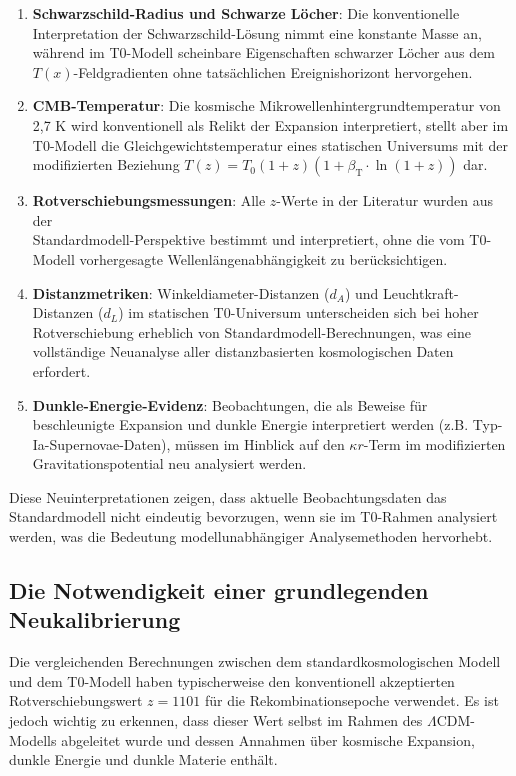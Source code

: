 \documentclass[12pt,a4paper]{article}
\newcommand{\Tfield}{T(x)}
\newcommand{\betaT}{\beta_{\text{T}}}
\newcommand{\Tzero}{T_0}
\begin{document}
	\begin{enumerate}
		\item \textbf{Schwarzschild-Radius und Schwarze Löcher}: Die konventionelle Interpretation der Schwarzschild-Lösung nimmt eine konstante Masse an, während im T0-Modell scheinbare Eigenschaften schwarzer Löcher aus dem $\Tfield$-Feldgradienten ohne tatsächlichen Ereignishorizont hervorgehen.
		\item \textbf{CMB-Temperatur}: Die kosmische Mikrowellenhintergrundtemperatur von 2,7 K wird konventionell als Relikt der Expansion interpretiert, stellt aber im T0-Modell die Gleichgewichtstemperatur eines statischen Universums mit der modifizierten Beziehung $T(z) = \Tzero (1 + z) (1 + \betaT \cdot \ln(1 + z))$ dar.
		\item \textbf{Rotverschiebungsmessungen}: Alle $z$-Werte in der Literatur wurden aus der \\Standardmodell-Perspektive bestimmt und interpretiert, ohne die vom T0-Modell vorhergesagte Wellenlängenabhängigkeit zu berücksichtigen.
		\item \textbf{Distanzmetriken}: Winkeldiameter-Distanzen ($d_A$) und Leuchtkraft-Distanzen ($d_L$) im statischen T0-Universum unterscheiden sich bei hoher Rotverschiebung erheblich von Standardmodell-Berechnungen, was eine vollständige Neuanalyse aller distanzbasierten kosmologischen Daten erfordert.
		\item \textbf{Dunkle-Energie-Evidenz}: Beobachtungen, die als Beweise für beschleunigte Expansion und dunkle Energie interpretiert werden (z.B. Typ-Ia-Supernovae-Daten), müssen im Hinblick auf den $\kappa r$-Term im modifizierten Gravitationspotential neu analysiert werden.
	\end{enumerate}
	
	Diese Neuinterpretationen zeigen, dass aktuelle Beobachtungsdaten das Standardmodell nicht eindeutig bevorzugen, wenn sie im T0-Rahmen analysiert werden, was die Bedeutung modellunabhängiger Analysemethoden hervorhebt.
	
	\subsection{Die Notwendigkeit einer grundlegenden Neukalibrierung}
	
	Die vergleichenden Berechnungen zwischen dem standardkosmologischen Modell und dem T0-Modell haben typischerweise den konventionell akzeptierten Rotverschiebungswert $z = 1101$ für die Rekombinationsepoche verwendet. Es ist jedoch wichtig zu erkennen, dass dieser Wert selbst im Rahmen des $\Lambda$CDM-Modells abgeleitet wurde und dessen Annahmen über kosmische Expansion, dunkle Energie und dunkle Materie enthält.
	
\end{document}
